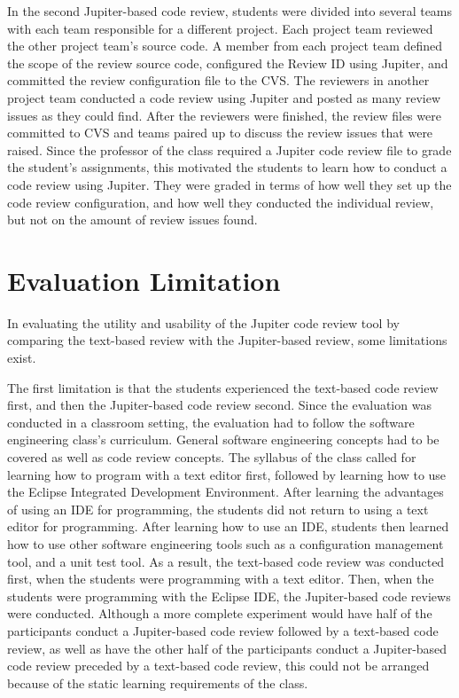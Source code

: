 In the second Jupiter-based code review, students were divided into several teams with each team responsible for a different project. Each project team reviewed the other project team's source code. A member from each project team defined the scope of the review source code, configured the Review ID using Jupiter, and committed the review configuration file to the CVS. The reviewers in another project team conducted a code review using Jupiter and posted as many review issues as they could find. After the reviewers were finished, the review files were committed to CVS and teams paired up to discuss the review issues that were raised. Since the professor of the class required a Jupiter code review file to grade the student's assignments, this motivated the students to learn how to conduct a code review using Jupiter. They were graded in terms of how well they set up the code review configuration, and how well they conducted the individual review, but not on the amount of review issues found.

\section{Evaluation Limitation}
\label{sec:evaluation-limitation}

In evaluating the utility and usability of the Jupiter code review tool by comparing the text-based review with the Jupiter-based review, some limitations exist.

The first limitation is that the students experienced the text-based code review first, and then the Jupiter-based code review second. Since the evaluation was conducted in a classroom setting, the evaluation had to follow the software engineering class's curriculum. General software engineering concepts had to be covered as well as code review concepts. The syllabus of the class called for learning how to program with a text editor first, followed by learning how to use the Eclipse Integrated Development Environment. After learning the advantages of using an IDE for programming, the students did not return to using a text editor for programming. After learning how to use an IDE, students then learned how to use other software engineering tools such as a configuration management tool, and a unit test tool. As a result, the text-based code review was conducted first, when the students were programming with a text editor. Then, when the students were programming with the Eclipse IDE, the Jupiter-based code reviews were conducted. Although a more complete experiment would have half of the participants conduct a Jupiter-based code review followed by a text-based code review, as well as have the other half of the participants conduct a Jupiter-based code review preceded by a text-based code review, this could not be arranged because of the static learning requirements of the class.


